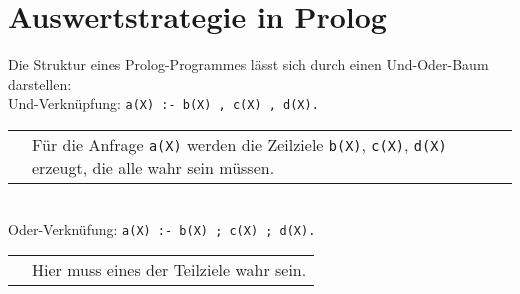\section{Auswertstrategie in Prolog}
Die Struktur  eines Prolog-Programmes lässt sich durch einen Und-Oder-Baum darstellen:\bigskip\\
Und-Verknüpfung: \lstinline$a(X) :- b(X) , c(X) , d(X).$\\
\begin{tabular}{L{.3} L{.7}}
 & \mpb[.6]
Für die Anfrage \lstinline$a(X)$ werden die Zeilziele \lstinline$b(X)$, \lstinline$c(X)$, \lstinline$d(X)$ erzeugt, die alle wahr sein müssen.
\mpe
\end{tabular}\\
Oder-Verknüfung: \lstinline$a(X) :- b(X) ; c(X) ; d(X).$\\
\begin{tabular}{L{.3} L{.7}}
 & \mpb[.6]
Hier muss eines der Teilziele wahr sein.
\mpe
\end{tabular}

